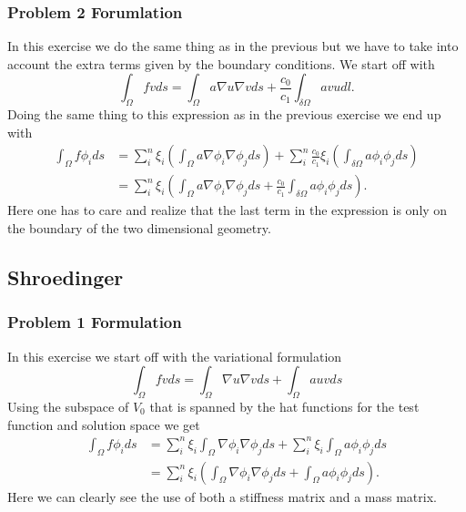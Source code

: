 \documentclass[11pt]{article}
\begin{document}
\subsubsection{Problem 2 Forumlation}
In this exercise we do the same thing as in the previous but we have to take into account the extra terms given by the boundary conditions. We start off with
\begin{equation}
	\int_{\Omega} f v ds = \int_{\Omega} a \nabla u \nabla v ds + \frac{c_0}{c_1}  \int_{\delta \Omega} a v u dl.
\end{equation}
Doing the same thing to this expression as in the previous exercise we end up with
\begin{align}
	\int_{\Omega} f \phi_i ds &=  \sum^n_i \xi_i (\int_{\Omega} a \nabla \phi_i \nabla \phi_j ds) + \sum^n_i \frac{c_0}{c_1} \xi_i (\int_{\delta \Omega} a \phi_i \phi_j ds) \\
	&= \sum^n_i \xi_i ( \int_{\Omega} a \nabla \phi_i \nabla \phi_j ds + \frac{c_0}{c_1} \int_{\delta \Omega} a \phi_i \phi_j ds).
\end{align}
Here one has to care and realize that the last term in the expression is only on the boundary of the two dimensional geometry. 
\subsection{Shroedinger}
\subsubsection{Problem 1 Formulation}
In this exercise we start off with the variational formulation
\begin{equation}
	\int_{\Omega} fv ds= \int_{\Omega} \nabla u \nabla v ds + \int_{\Omega} a u v ds
\end{equation}
Using the subspace of $V_0$ that is spanned by the hat functions for the test function and solution space we get
\begin{align}
	\int_{\Omega} f \phi_i ds &= \sum^n_i \xi_i \int_{\Omega} \nabla \phi_i \nabla \phi_j ds + \sum^n_i \xi_i \int_{\Omega}a \phi_i \phi_j ds \\
	&= \sum^n_i \xi_i ( \int_{\Omega} \nabla \phi_i \nabla \phi_j ds + \int_{\Omega}a \phi_i \phi_j ds).
\end{align}
Here we can clearly see the use of both a stiffness matrix and a mass matrix. 
\end{document}
